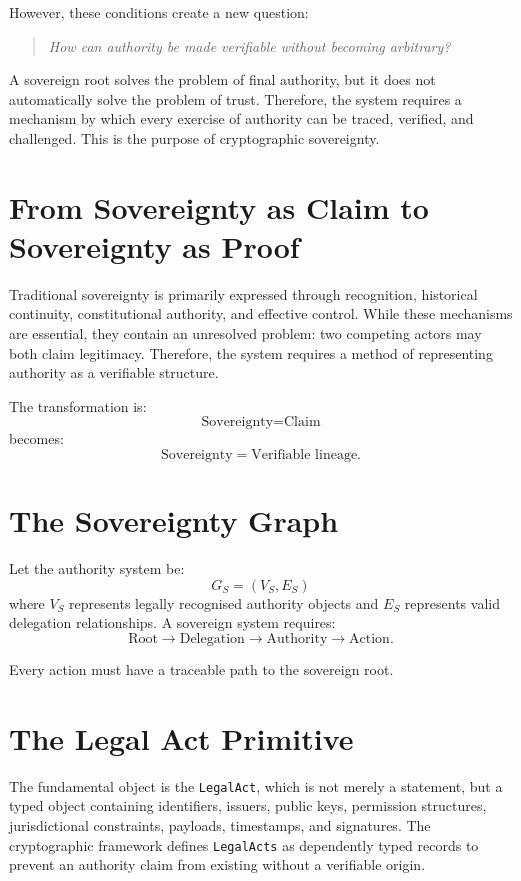 \documentclass[11pt,openany]{book}
\theoremstyle{plain}
\theoremstyle{definition}
\begin{document}
However, these conditions create a new question:
\begin{quote}
\textit{How can authority be made verifiable without becoming arbitrary?}
\end{quote}

A sovereign root solves the problem of final authority, but it does not automatically solve the problem of trust. Therefore, the system requires a mechanism by which every exercise of authority can be traced, verified, and challenged. This is the purpose of cryptographic sovereignty.

\section*{From Sovereignty as Claim to Sovereignty as Proof}

Traditional sovereignty is primarily expressed through recognition, historical continuity, constitutional authority, and effective control. While these mechanisms are essential, they contain an unresolved problem: two competing actors may both claim legitimacy. Therefore, the system requires a method of representing authority as a verifiable structure.

The transformation is:
\[
\text{Sovereignty} = \text{Claim}
\]
becomes:
\[
\text{Sovereignty} = \text{Verifiable lineage}.
\]

\section*{The Sovereignty Graph}

Let the authority system be:
\[
G_S = (V_S, E_S)
\]
where \(V_S\) represents legally recognised authority objects and \(E_S\) represents valid delegation relationships. A sovereign system requires:
\[
\text{Root} \longrightarrow \text{Delegation} \longrightarrow \text{Authority} \longrightarrow \text{Action}.
\]

Every action must have a traceable path to the sovereign root.

\section*{The Legal Act Primitive}

The fundamental object is the \texttt{LegalAct}, which is not merely a statement, but a typed object containing identifiers, issuers, public keys, permission structures, jurisdictional constraints, payloads, timestamps, and signatures. The cryptographic framework defines \texttt{LegalActs} as dependently typed records to prevent an authority claim from existing without a verifiable origin.
\end{document}
